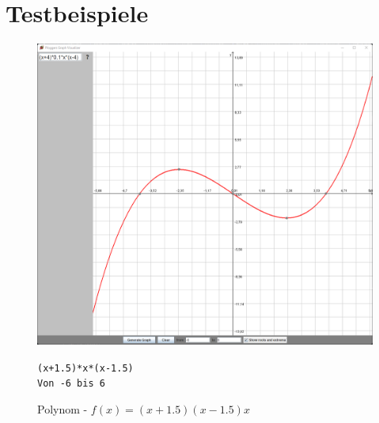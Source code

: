 \documentclass[12pt]{article}
\begin{document}
	\section*{Testbeispiele}

	\begin{figure}[!ht]
		\begin{center}
		\includegraphics[scale=0.5]{images/sample1.png}
		\end{center}
		\caption{Polynom - $f(x) = (x+1.5)(x-1.5)x$}
		
		\begin{center}
			\texttt{(x+1.5)*x*(x-1.5)} \\
			\texttt{Von -6 bis 6}
		\end{center}
	\end{figure}
\end{document}
